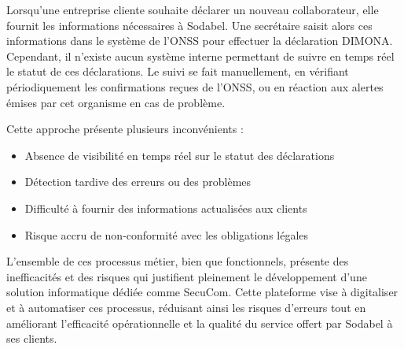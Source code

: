 Lorsqu'une entreprise cliente souhaite déclarer un nouveau collaborateur, elle fournit les informations nécessaires à Sodabel. Une secrétaire saisit alors ces informations dans le système de l'ONSS pour effectuer la déclaration DIMONA. Cependant, il n'existe aucun système interne permettant de suivre en temps réel le statut de ces déclarations. Le suivi se fait manuellement, en vérifiant périodiquement les confirmations reçues de l'ONSS, ou en réaction aux alertes émises par cet organisme en cas de problème.

Cette approche présente plusieurs inconvénients :
\begin{itemize}
  \item Absence de visibilité en temps réel sur le statut des déclarations
  \item Détection tardive des erreurs ou des problèmes
  \item Difficulté à fournir des informations actualisées aux clients
  \item Risque accru de non-conformité avec les obligations légales
\end{itemize}

L'ensemble de ces processus métier, bien que fonctionnels, présente des inefficacités et des risques qui justifient pleinement le développement d'une solution informatique dédiée comme SecuCom. Cette plateforme vise à digitaliser et à automatiser ces processus, réduisant ainsi les risques d'erreurs tout en améliorant l'efficacité opérationnelle et la qualité du service offert par Sodabel à ses clients.
